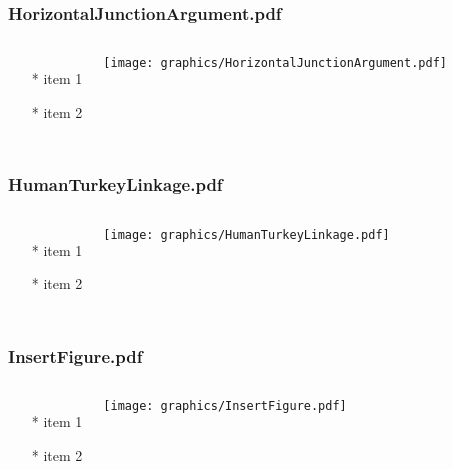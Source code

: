 \documentclass{beamer}
\begin{document}
\begin{frame} \frametitle{HorizontalJunctionArgument.pdf}
    \begin{columns}[c]
        \begin{itemize}
            \item[*] item 1
            \item[*] item 2
        \end{itemize}
        \begin{minipage}{\linewidth}
            \begin{center}
            \texttt{[image: graphics/HorizontalJunctionArgument.pdf]}
            \label{gfx:HorizontalJunctionArgument.pdf}
            \end{center}
        \end{minipage}
    \end{columns}
\end{frame}
\begin{frame} \frametitle{HumanTurkeyLinkage.pdf}
    \begin{columns}[c]
        \begin{itemize}
            \item[*] item 1
            \item[*] item 2
        \end{itemize}
        \begin{minipage}{\linewidth}
            \begin{center}
            \texttt{[image: graphics/HumanTurkeyLinkage.pdf]}
            \label{gfx:HumanTurkeyLinkage.pdf}
            \end{center}
        \end{minipage}
    \end{columns}
\end{frame}
\begin{frame} \frametitle{InsertFigure.pdf}
    \begin{columns}[c]
        \begin{itemize}
            \item[*] item 1
            \item[*] item 2
        \end{itemize}
        \begin{minipage}{\linewidth}
            \begin{center}
            \texttt{[image: graphics/InsertFigure.pdf]}
            \label{gfx:InsertFigure.pdf}
            \end{center}
        \end{minipage}
    \end{columns}
\end{frame}
\end{document}
